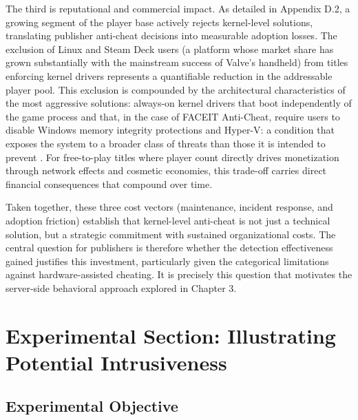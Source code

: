 The third is reputational and commercial impact. As detailed in Appendix D.2, a growing segment of the player base actively rejects kernel-level solutions, translating publisher anti-cheat decisions into measurable adoption losses. The exclusion of Linux and Steam Deck users (a platform whose market share has grown substantially with the mainstream success of Valve's handheld) from titles enforcing kernel drivers represents a quantifiable reduction in the addressable player pool. This exclusion is compounded by the architectural characteristics of the most aggressive solutions: always-on kernel drivers that boot independently of the game process and that, in the case of FACEIT Anti-Cheat, require users to disable Windows memory integrity protections and Hyper-V: a condition that exposes the system to a broader class of threats than those it is intended to prevent \cite{Dorner2024}. For free-to-play titles where player count directly drives monetization through network effects and cosmetic economies, this trade-off carries direct financial consequences that compound over time.

Taken together, these three cost vectors (maintenance, incident response, and adoption friction) establish that kernel-level anti-cheat is not just a technical solution, but a strategic commitment with sustained organizational costs. The central question for publishers is therefore whether the detection effectiveness gained justifies this investment, particularly given the categorical limitations against hardware-assisted cheating. It is precisely this question that motivates the server-side behavioral approach explored in Chapter 3.

\section{Experimental Section: Illustrating Potential Intrusiveness}
\label{sec:two:two}

\subsection{Experimental Objective}
\label{sec:two:two:one}

